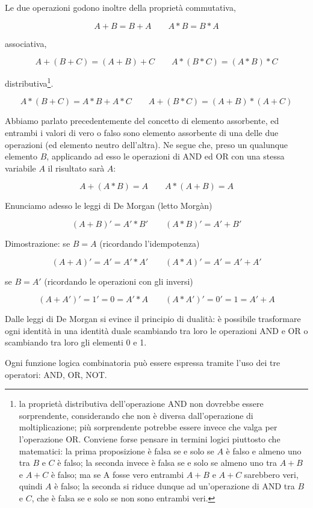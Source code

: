 \documentclass{article}
\begin{document}
Le due operazioni godono inoltre della proprietà commutativa,

\[A + B = B+ A \quad \quad A * B = B * A\]

associativa,

\[A + (B + C) = (A + B) + C \quad \quad A * (B * C) = (A * B) * C\]

distributiva\footnote{la proprietà distributiva dell'operazione AND non dovrebbe essere sorprendente, considerando che non è diversa dall'operazione di moltiplicazione; più sorprendente potrebbe essere invece che valga per l'operazione OR. Conviene forse pensare in termini logici piuttosto che matematici: la prima proposizione è falsa se e solo se $A$ è falso e almeno uno tra $B$ e $C$ è falso; la seconda invece è falsa se e solo se almeno uno tra $A + B$ e $A + C$ è falso; ma se A fosse vero entrambi $A + B$ e $A + C$ sarebbero veri, quindi $A$ è falso; la seconda si riduce dunque ad un'operazione di AND tra $B$ e $C$, che è falsa se e solo se non sono entrambi veri.}.

\[A * (B + C) = A * B + A * C \quad \quad A + (B * C) = (A + B) * (A + C)\]

Abbiamo parlato precedentemente del concetto di elemento assorbente, ed entrambi i valori di vero o falso sono elemento assorbente di una delle due operazioni (ed elemento neutro dell'altra). Ne segue che, preso un qualunque elemento $B$, applicando ad esso le operazioni di AND ed OR con una stessa variabile $A$ il risultato sarà $A$:

\[A + (A * B) = A \quad \quad A * (A + B) = A\]

Enunciamo adesso le leggi di De Morgan (letto Morgàn)

\[(A + B)' = A' * B' \quad \quad (A * B)' = A' + B'\]

Dimostrazione: se $B = A$ (ricordando l'idempotenza)

\[(A + A)' = A' = A' * A' \quad \quad (A * A)' = A' = A' + A'\]

se $B = A'$ (ricordando le operazioni con gli inversi)

\[(A + A')' = 1' = 0 = A' * A \quad \quad (A * A')' = 0' = 1 = A' + A\]

Dalle leggi di De Morgan si evince il principio di dualità: è possibile trasformare ogni identità in una identità duale scambiando tra loro le operazioni AND e OR o scambiando tra loro gli elementi 0 e 1.

\vspace{3mm}

Ogni funzione logica combinatoria può essere espressa tramite l'uso dei tre operatori: AND, OR, NOT.
\end{document}
